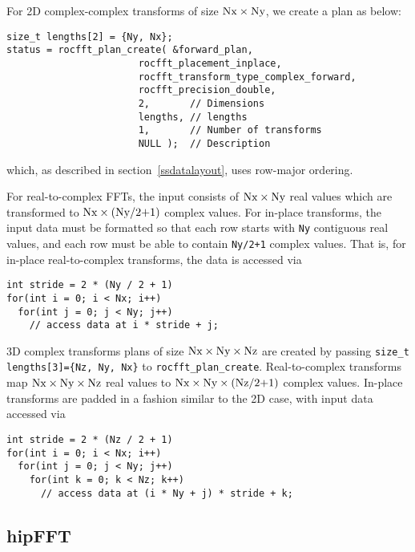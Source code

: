\documentclass[10pt]{article}
\renewcommand{\(}{\left(}
\renewcommand{\)}{\right)}
\begin{document}
For 2D complex-complex transforms of size
$\text{\lstinline{Nx}}\times\text{\lstinline{Ny}}$, we create a plan
as below:
\begin{lstlisting}
size_t lengths[2] = {Ny, Nx};
status = rocfft_plan_create( &forward_plan,
                       rocfft_placement_inplace,
                       rocfft_transform_type_complex_forward,
                       rocfft_precision_double,
                       2,       // Dimensions
                       lengths, // lengths
                       1,       // Number of transforms
                       NULL );  // Description
\end{lstlisting}
which, as described in section~\ref{ssdatalayout}, uses row-major
ordering.

For real-to-complex FFTs, the input consists of
$\text{\lstinline{Nx}}\times\text{\lstinline{Ny}}$ real values which
are transformed to
$\text{\lstinline{Nx}}\times(\text{\lstinline{Ny/2+1}})$ complex
values.  For in-place transforms, the input data must be formatted so
that each row starts with \lstinline{Ny} contiguous real values, and
each row must be able to contain \lstinline{Ny/2+1} complex values.
That is, for in-place real-to-complex transforms, the data is accessed
via
\begin{lstlisting}
int stride = 2 * (Ny / 2 + 1)
for(int i = 0; i < Nx; i++)
  for(int j = 0; j < Ny; j++)
    // access data at i * stride + j;
\end{lstlisting}

3D complex transforms plans of size
$\text{\lstinline{Nx}}\times\text{\lstinline{Ny}}\times\text{\lstinline{Nz}}$
are created by passing \lstinline|size_t lengths[3]={Nz, Ny, Nx}| to
\lstinline{rocfft_plan_create}.  Real-to-complex transforms map
$\text{\lstinline{Nx}}\times\text{\lstinline{Ny}}\times\text{\lstinline{Nz}}$
real values to
$\text{\lstinline{Nx}}\times\text{\lstinline{Ny}}\times(\text{\lstinline{Nz/2+1}})$
complex values.  In-place transforms are padded in a fashion similar
to the 2D case, with input data accessed via

\begin{lstlisting}
int stride = 2 * (Nz / 2 + 1)
for(int i = 0; i < Nx; i++)
  for(int j = 0; j < Ny; j++)
    for(int k = 0; k < Nz; k++)
      // access data at (i * Ny + j) * stride + k;
\end{lstlisting}

\subsection{hipFFT}
\end{document}

